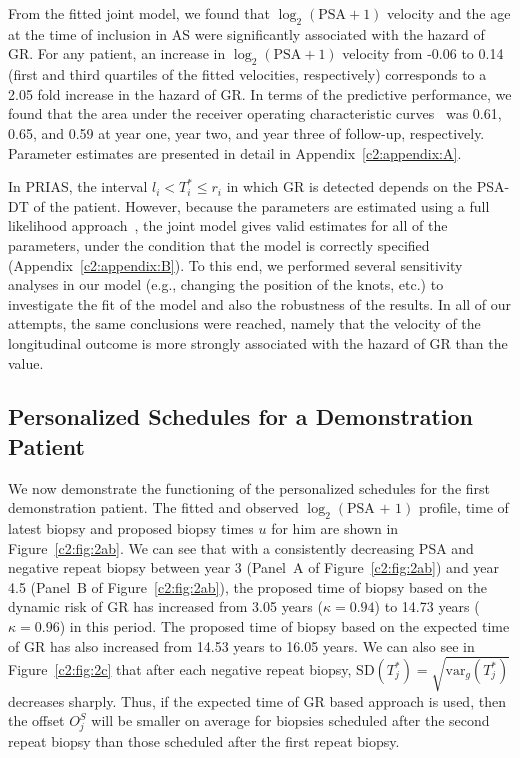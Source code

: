From the fitted joint model, we found that $\log_2 (\mbox{PSA} + 1)$ velocity and the age at the time of inclusion in AS were significantly associated with the hazard of GR. For any patient, an increase in $\log_2 (\mbox{PSA} + 1)$ velocity from -0.06 to 0.14 (first and third quartiles of the fitted velocities, respectively) corresponds to a 2.05 fold increase in the hazard of GR. In terms of the predictive performance, we found that the area under the receiver operating characteristic curves~\citep{landmarking2017} was 0.61, 0.65, and 0.59 at year one, year two, and year three of follow-up, respectively. Parameter estimates are presented in detail in Appendix~\ref{c2:appendix:A}.

In PRIAS, the interval $l_i < T_i^* \leq r_i$ in which GR is detected depends on the PSA-DT of the patient. However, because the parameters are estimated using a full likelihood approach~\citep{tsiatis2004joint}, the joint model gives valid estimates for all of the parameters, under the condition that the model is correctly specified (Appendix~\ref{c2:appendix:B}). To this end, we performed several sensitivity analyses in our model (e.g., changing the position of the knots, etc.) to investigate the fit of the model and also the robustness of the results. In all of our attempts, the same conclusions were reached, namely that the velocity of the longitudinal outcome is more strongly associated with the hazard of GR than the value.

\subsection{Personalized Schedules for a Demonstration Patient}
\label{c2:subsec:demo_prias_pers_schedule}
We now demonstrate the functioning of the personalized schedules for the first demonstration patient. The fitted and observed $\log_2 (\mbox{PSA + 1})$ profile, time of latest biopsy and proposed biopsy times $u$ for him are shown in Figure~\ref{c2:fig:2ab}. We can see that with a consistently decreasing PSA and negative repeat biopsy between year 3 (Panel~A of Figure~\ref{c2:fig:2ab}) and year 4.5 (Panel~B of Figure~\ref{c2:fig:2ab}), the proposed time of biopsy based on the dynamic risk of GR has increased from 3.05 years ($\kappa=0.94$) to 14.73 years ($\kappa=0.96$) in this period. The proposed time of biopsy based on the expected time of GR has also increased from 14.53 years to 16.05 years. We can also see in Figure~\ref{c2:fig:2c} that after each negative repeat biopsy, $\mbox{SD}(T^*_j) = \sqrt{\mbox{var}_g(T^*_j)}$ decreases sharply. Thus, if the expected time of GR based approach is used, then the offset $O^S_j$ will be smaller on average for biopsies scheduled after the second repeat biopsy than those scheduled after the first repeat biopsy.

